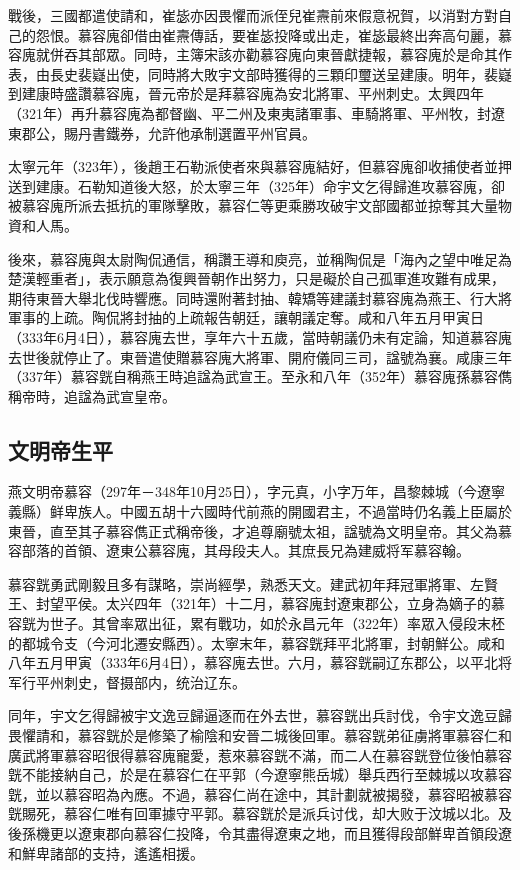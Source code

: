 戰後，三國都遣使請和，崔毖亦因畏懼而派侄兒崔燾前來假意祝賀，以消對方對自己的怨恨。慕容廆卻借由崔燾傳話，要崔毖投降或出走，崔毖最終出奔高句麗，慕容廆就併吞其部眾。同時，主簿宋該亦勸慕容廆向東晉獻捷報，慕容廆於是命其作表，由長史裴嶷出使，同時將大敗宇文部時獲得的三顆印璽送呈建康。明年，裴嶷到建康時盛讚慕容廆，晉元帝於是拜慕容廆為安北將軍、平州刺史。太興四年（321年）再升慕容廆為都督幽、平二州及東夷諸軍事、車騎將軍、平州牧，封遼東郡公，賜丹書鐵券，允許他承制選置平州官員。

太寧元年（323年），後趙王石勒派使者來與慕容廆結好，但慕容廆卻收捕使者並押送到建康。石勒知道後大怒，於太寧三年（325年）命宇文乞得歸進攻慕容廆，卻被慕容廆所派去抵抗的軍隊擊敗，慕容仁等更乘勝攻破宇文部國都並掠奪其大量物資和人馬。

後來，慕容廆與太尉陶侃通信，稱讚王導和庾亮，並稱陶侃是「海內之望中唯足為楚漢輕重者」，表示願意為復興晉朝作出努力，只是礙於自己孤軍進攻難有成果，期待東晉大舉北伐時響應。同時還附著封抽、韓矯等建議封慕容廆為燕王、行大將軍事的上疏。陶侃將封抽的上疏報告朝廷，讓朝議定奪。咸和八年五月甲寅日（333年6月4日），慕容廆去世，享年六十五歲，當時朝議仍未有定論，知道慕容廆去世後就停止了。東晉遣使贈慕容廆大將軍、開府儀同三司，諡號為襄。咸康三年（337年）慕容皝自稱燕王時追諡為武宣王。至永和八年（352年）慕容廆孫慕容儁稱帝時，追諡為武宣皇帝。

\subsection{文明帝生平}

燕文明帝慕容（297年－348年10月25日），字元真，小字万年，昌黎棘城（今遼寧義縣）鲜卑族人。中國五胡十六國時代前燕的開國君主，不過當時仍名義上臣屬於東晉，直至其子慕容儁正式稱帝後，才追尊廟號太祖，諡號為文明皇帝。其父為慕容部落的首領、遼東公慕容廆，其母段夫人。其庶長兄為建威将军慕容翰。

慕容皝勇武剛毅且多有謀略，崇尚經學，熟悉天文。建武初年拜冠軍將軍、左賢王、封望平侯。太兴四年（321年）十二月，慕容廆封遼東郡公，立身為嫡子的慕容皝为世子。其曾率眾出征，累有戰功，如於永昌元年（322年）率眾入侵段末柸的都城令支（今河北遷安縣西）。太寧末年，慕容皝拜平北將軍，封朝鮮公。咸和八年五月甲寅（333年6月4日），慕容廆去世。六月，慕容皝嗣辽东郡公，以平北将军行平州刺史，督摄部内，统治辽东。

同年，宇文乞得歸被宇文逸豆歸逼逐而在外去世，慕容皝出兵討伐，令宇文逸豆歸畏懼請和，慕容皝於是修築了榆陰和安晉二城後回軍。慕容皝弟征虜將軍慕容仁和廣武將軍慕容昭很得慕容廆寵愛，惹來慕容皝不滿，而二人在慕容皝登位後怕慕容皝不能接納自己，於是在慕容仁在平郭（今遼寧熊岳城）舉兵西行至棘城以攻慕容皝，並以慕容昭為內應。不過，慕容仁尚在途中，其計劃就被揭發，慕容昭被慕容皝賜死，慕容仁唯有回軍據守平郭。慕容皝於是派兵讨伐，却大败于汶城以北。及後孫機更以遼東郡向慕容仁投降，令其盡得遼東之地，而且獲得段部鮮卑首領段遼和鮮卑諸部的支持，遙遙相援。

